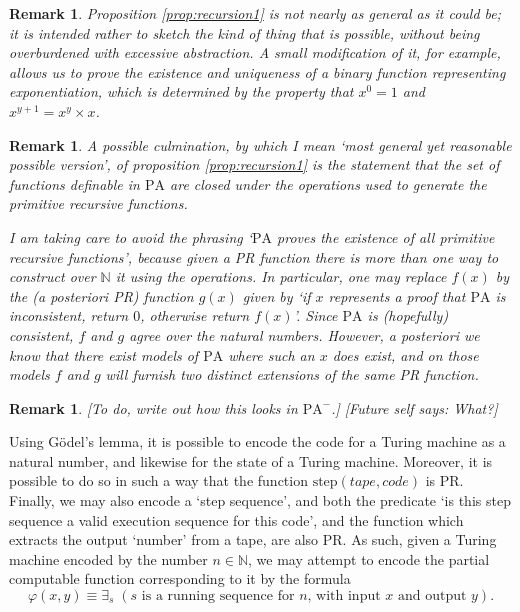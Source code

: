 \documentclass{article}
\newtheorem{remark}[theorem]{Remark}
\theoremstyle{nonumberplain}
\newcommand{\N}{\mathbb{N}}
\newcommand{\PA}{\mathrm{PA}}
\newcommand{\WPA}{\PA^-}
\begin{document}
\begin{remark}
Proposition \ref{prop:recursion1} is not nearly as general as it could be; it is intended rather to sketch the kind of thing that is possible, without being overburdened with excessive abstraction. A small modification of it, for example, allows us to prove the existence and uniqueness of a binary function representing exponentiation, which is determined by the property that $x^0 = 1$ and $x^{y+1} = x^y \times x$.
\end{remark}

\begin{remark}
A possible culmination, by which I mean `most general yet reasonable possible version', of proposition \ref{prop:recursion1} is the statement that the set of functions definable in $\PA$ are closed under the operations used to generate the primitive recursive functions.

I am taking care to avoid the phrasing `$\PA$ proves the existence of all primitive recursive functions', because given a PR function there is more than one way to construct over $\N$ it using the operations. In particular, one may replace $f(x)$ by the (\textit{a posteriori} PR) function $g(x)$ given by `if $x$ represents a proof that $\PA$ is inconsistent, return $0$, otherwise return $f(x)$'. Since $\PA$ is (hopefully) consistent, $f$ and $g$ agree over the natural numbers. However, \textit{a posteriori} we know that there exist models of $\PA$ where such an $x$ does exist, and on those models $f$ and $g$ will furnish two distinct extensions of the same PR function.
\end{remark}

\begin{remark}
{}[To do, write out how this looks in $\WPA$.] [Future self says: What?]
\end{remark}

Using Gödel's lemma, it is possible to encode the code for a Turing machine as a natural number, and likewise for the state of a Turing machine. Moreover, it is possible to do so in such a way that the function $\textrm{step}(tape, code)$ is PR. Finally, we may also encode a `step sequence', and both the predicate `is this step sequence a valid execution sequence for this code', and the function which extracts the output `number' from a tape, are also PR. As such, given a Turing machine encoded by the number $n \in \N$, we may attempt to encode the partial computable function corresponding to it by the formula
\begin{equation}
\varphi(x, y) \equiv \exists_{s} \; (\text{$s$ is a running sequence for $n$, with input $x$ and output $y$}).
\end{equation}
\end{document}
